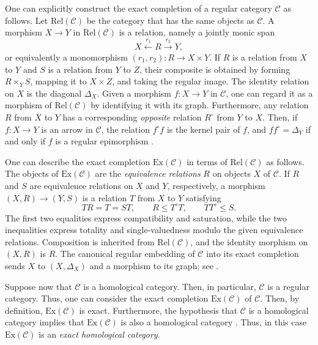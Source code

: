 \documentclass[12pt]{amsart}
\theoremstyle{definition}
\begin{document}
One can explicitly construct the exact completion of a regular category $%
\mathcal{C}$ as follows. Let $\mathrm{Rel}\left( \mathcal{C}\right) $ be the
category that has the same objects as $\mathcal{C}$. A morphism $%
X\rightarrow Y$ in $\mathrm{Rel}\left( \mathcal{C}\right) $ is a relation,
namely a jointly monic span 
\begin{equation*}
X\xleftarrow{\ r_{1}\ }R\xrightarrow{\ r_{2}\ }Y,
\end{equation*}%
or equivalently a monomorphism $\left( r_{1},r_{2}\right) :R\rightarrow
X\times Y$. If $R$ is a relation from $X$ to $Y$ and $S$ is a relation from $%
Y$ to $Z$, their composite is obtained by forming $R\times _{Y}S$, mapping
it to $X\times Z$, and taking the regular image. The identity relation on $X$
is the diagonal $\Delta _{X}$. Given a morphism $f:X\rightarrow Y$ in $%
\mathcal{C}$, one can regard it as a morphism of $\mathrm{Rel}\left( 
\mathcal{C}\right) $ by identifying it with its graph. Furthermore, any
relation $R$ from $X$ to $Y$ has a corresponding \emph{opposite} relation $%
R^{\circ }$ from $Y$ to $X$. Then, if $f:X\rightarrow Y$ is an arrow in $%
\mathcal{C}$, the relation $f^{\circ }f$ is the kernel pair of $f$, and $%
ff^{\circ }=\Delta _{Y}$ if and only if $f$ is a regular epimorphism \cite%
{carboni_diagram_1991}.

One can describe the exact completion $\mathrm{Ex}\left( \mathcal{C}\right) $
in terms of \textrm{Rel}$\left( \mathcal{C}\right) $ as follows. The objects
of $\mathrm{Ex}\left( \mathcal{C}\right) $ are the \emph{equivalence
relations} $R$ on objects $X$ of $\mathcal{C}$. If $R$ and $S$ are
equivalence relations on $X$ and $Y$, respectively, a morphism $\left(
X,R\right) \rightarrow \left( Y,S\right) $ is a relation $T$ from $X$ to $Y$
satisfying 
\begin{equation*}
TR=T=ST,\qquad R\leq T^{\circ }T,\qquad TT^{\circ }\leq S.
\end{equation*}%
The first two equalities express compatibility and saturation, while the two
inequalities express totality and single-valuedness modulo the given
equivalence relations. Composition is inherited from $\mathrm{Rel}\left( 
\mathcal{C}\right) $, and the identity morphism on $\left( X,R\right) $ is $%
R $. The canonical regular embedding of $\mathcal{C}$ into its exact
completion sends $X$ to $\left( X,\Delta _{X}\right) $ and a morphism to its
graph; see \cite[Definition 14]{carboni_regular_1998}.

Suppose now that $\mathcal{C}$ is a homological category. Then, in
particular, $\mathcal{C}$ is a regular category. Thus, one can consider the
exact completion $\mathrm{Ex}\left( \mathcal{C}\right) $ of $\mathcal{C}$.
Then, by definition, $\mathrm{Ex}\left( \mathcal{C}\right) $ is exact.
Furthermore, the hypothesis that $\mathcal{C}$ is a homological category
implies that $\mathrm{Ex}\left( \mathcal{C}\right) $ is also a homological
category \cite[Proposition 5.2]{gran_semi-localizations_2016}. Thus, in this
case $\mathrm{Ex}\left( \mathcal{C}\right) $ is an \emph{exact homological
category}.
\end{document}
